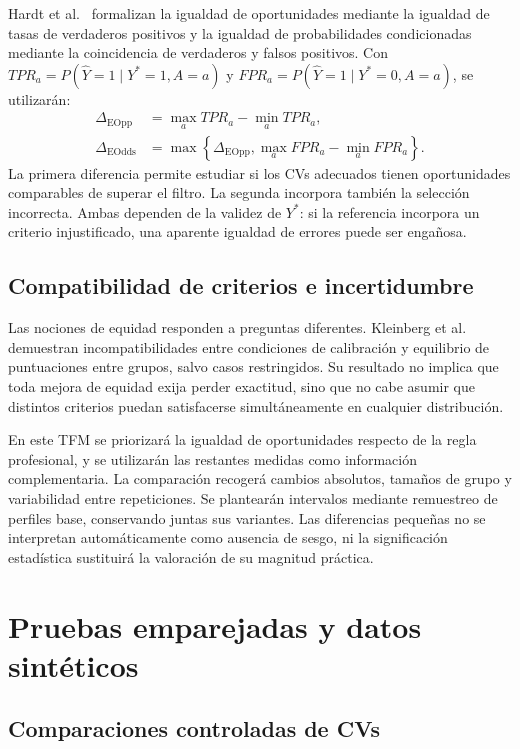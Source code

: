 \documentclass[11pt,a4paper,oneside]{report}
\begin{document}
Hardt et al.\ \cite{hardt2016} formalizan la igualdad de oportunidades mediante la igualdad de tasas de verdaderos positivos y la igualdad de probabilidades condicionadas mediante la coincidencia de verdaderos y falsos positivos. Con $TPR_a=P(\widehat{Y}=1\mid Y^{*}=1,A=a)$ y $FPR_a=P(\widehat{Y}=1\mid Y^{*}=0,A=a)$, se utilizarán:
\begin{align}
\Delta_{\mathrm{EOpp}}&=\max_a TPR_a-\min_a TPR_a,\\
\Delta_{\mathrm{EOdds}}&=\max\left\{\Delta_{\mathrm{EOpp}},\max_a FPR_a-\min_a FPR_a\right\}.
\end{align}
La primera diferencia permite estudiar si los CVs adecuados tienen oportunidades comparables de superar el filtro. La segunda incorpora también la selección incorrecta. Ambas dependen de la validez de $Y^{*}$: si la referencia incorpora un criterio injustificado, una aparente igualdad de errores puede ser engañosa.

\subsection{Compatibilidad de criterios e incertidumbre}

Las nociones de equidad responden a preguntas diferentes. Kleinberg et al.\ \cite{kleinberg2017} demuestran incompatibilidades entre condiciones de calibración y equilibrio de puntuaciones entre grupos, salvo casos restringidos. Su resultado no implica que toda mejora de equidad exija perder exactitud, sino que no cabe asumir que distintos criterios puedan satisfacerse simultáneamente en cualquier distribución.

En este TFM se priorizará la igualdad de oportunidades respecto de la regla profesional, y se utilizarán las restantes medidas como información complementaria. La comparación recogerá cambios absolutos, tamaños de grupo y variabilidad entre repeticiones. Se plantearán intervalos mediante remuestreo de perfiles base, conservando juntas sus variantes. Las diferencias pequeñas no se interpretan automáticamente como ausencia de sesgo, ni la significación estadística sustituirá la valoración de su magnitud práctica.

\section{Pruebas emparejadas y datos sintéticos}

\subsection{Comparaciones controladas de CVs}
\end{document}
